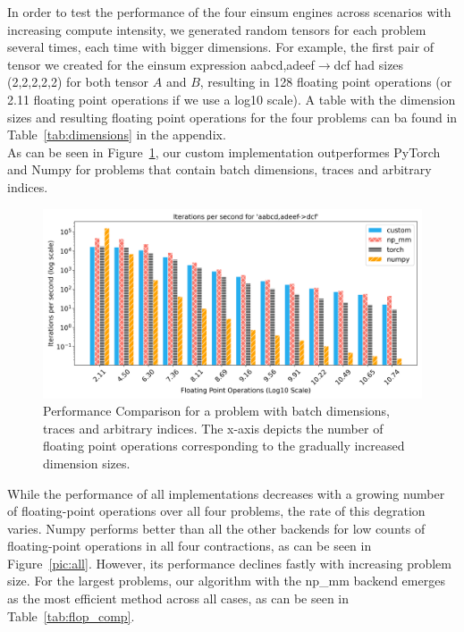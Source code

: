 \noindent In order to test the performance of the four einsum engines across scenarios with increasing compute intensity, we generated random tensors for each problem several times, each time with bigger dimensions. For example, the first pair of tensor we created for the einsum expression aabcd,adeef$\rightarrow$dcf had sizes (2,2,2,2,2) for both tensor $A$ and $B$, resulting in 128 floating point operations (or 2.11 floating point operations if we use a log10 scale). A table with the dimension sizes and resulting floating point operations for the four problems can ba found in Table~\ref{tab:dimensions} in the appendix.\\

\noindent As can be seen in Figure~\ref{flops}, our custom implementation outperformes PyTorch and Numpy for problems that contain batch dimensions, traces and arbitrary indices.
\begin{figure}[h]
    \label{flops}
    \centering
    \includegraphics[width=1\textwidth]{images/aabcd_adeef__dcf.png}  %
    \caption{Performance Comparison for a problem with batch dimensions, traces and arbitrary indices. The x-axis depicts the number of floating point operations corresponding to the gradually increased dimension sizes.}
\end{figure}

\noindent While the performance of all implementations decreases with a growing number of floating-point operations over all four problems, the rate of this degration varies. Numpy performs better than all the other backends for low counts of floating-point operations in all four contractions, as can be seen in Figure~\ref{pic:all}. However, its performance declines fastly with increasing problem size. For the largest problems, our algorithm with the np\_mm backend emerges as the most efficient method across all cases, as can be seen in Table~\ref{tab:flop_comp}.

